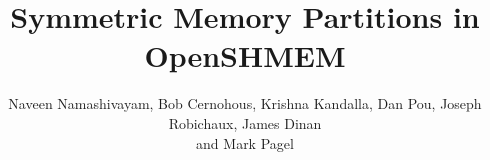 \documentclass[runningheads,a4paper]{llncs}
\begin{document}
\mainmatter
\title{Symmetric Memory Partitions in OpenSHMEM}
\author{Naveen Namashivayam\affmark[1],
        Bob Cernohous\affmark[1],
        Krishna Kandalla\affmark[1],
        Dan Pou\affmark[1],
        Joseph Robichaux\affmark[2],
        James Dinan\affmark[2]\\
        and
        Mark Pagel\affmark[1]}


\maketitle
\begin{abstract}

\end{abstract}














\end{document}
